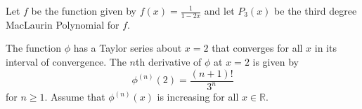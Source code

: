 \documentclass[addpoints]{exam}
\begin{document}
\begin{questions}

	\newpage

	\question Let $f$ be the function given by $\displaystyle f(x)=\frac{1}{1-2x}$ and let $P_3(x)$ be the third degree MacLaurin Polynomial for $f$.

	\newpage

	\question The function $\phi$ has a Taylor series about $x=2$ that converges for all $x$ in its interval of convergence. The $n$th derivative of $\phi$ at $x=2$ is given by \[\phi^{(n)}(2)=\frac{(n+1)!}{3^n}\] for $n\ge1$. Assume that $\phi^{(n)}(x)$ is increasing for all $x\in\mathbb{R}$.
	\begin{parts}

\end{parts}
\end{questions}
\end{document}
